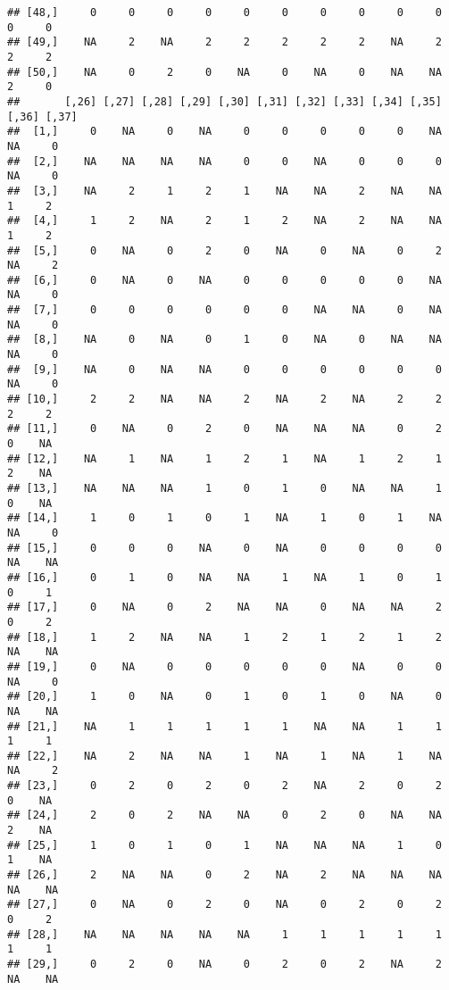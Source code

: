 \documentclass[
]{article}
\begin{document}
\begin{verbatim}
## [48,]     0     0     0     0     0     0     0     0     0     0     0     0
## [49,]    NA     2    NA     2     2     2     2     2    NA     2     2     2
## [50,]    NA     0     2     0    NA     0    NA     0    NA    NA     2     0
##       [,26] [,27] [,28] [,29] [,30] [,31] [,32] [,33] [,34] [,35] [,36] [,37]
##  [1,]     0    NA     0    NA     0     0     0     0     0    NA    NA     0
##  [2,]    NA    NA    NA    NA     0     0    NA     0     0     0    NA     0
##  [3,]    NA     2     1     2     1    NA    NA     2    NA    NA     1     2
##  [4,]     1     2    NA     2     1     2    NA     2    NA    NA     1     2
##  [5,]     0    NA     0     2     0    NA     0    NA     0     2    NA     2
##  [6,]     0    NA     0    NA     0     0     0     0     0    NA    NA     0
##  [7,]     0     0     0     0     0     0    NA    NA     0    NA    NA     0
##  [8,]    NA     0    NA     0     1     0    NA     0    NA    NA    NA     0
##  [9,]    NA     0    NA    NA     0     0     0     0     0     0    NA     0
## [10,]     2     2    NA    NA     2    NA     2    NA     2     2     2     2
## [11,]     0    NA     0     2     0    NA    NA    NA     0     2     0    NA
## [12,]    NA     1    NA     1     2     1    NA     1     2     1     2    NA
## [13,]    NA    NA    NA     1     0     1     0    NA    NA     1     0    NA
## [14,]     1     0     1     0     1    NA     1     0     1    NA    NA     0
## [15,]     0     0     0    NA     0    NA     0     0     0     0    NA    NA
## [16,]     0     1     0    NA    NA     1    NA     1     0     1     0     1
## [17,]     0    NA     0     2    NA    NA     0    NA    NA     2     0     2
## [18,]     1     2    NA    NA     1     2     1     2     1     2    NA    NA
## [19,]     0    NA     0     0     0     0     0    NA     0     0    NA     0
## [20,]     1     0    NA     0     1     0     1     0    NA     0    NA    NA
## [21,]    NA     1     1     1     1     1    NA    NA     1     1     1     1
## [22,]    NA     2    NA    NA     1    NA     1    NA     1    NA    NA     2
## [23,]     0     2     0     2     0     2    NA     2     0     2     0    NA
## [24,]     2     0     2    NA    NA     0     2     0    NA    NA     2    NA
## [25,]     1     0     1     0     1    NA    NA    NA     1     0     1    NA
## [26,]     2    NA    NA     0     2    NA     2    NA    NA    NA    NA    NA
## [27,]     0    NA     0     2     0    NA     0     2     0     2     0     2
## [28,]    NA    NA    NA    NA    NA     1     1     1     1     1     1     1
## [29,]     0     2     0    NA     0     2     0     2    NA     2    NA    NA

\end{verbatim}
\end{document}
